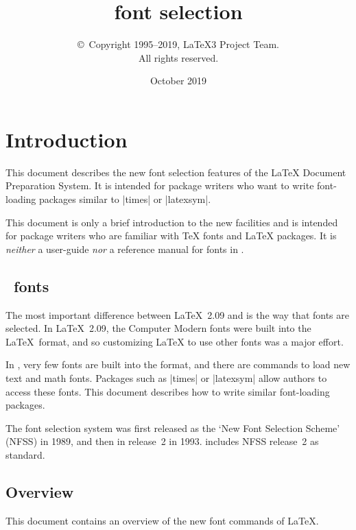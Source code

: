 \documentclass{ltxguide}[1995/11/28]
\title{\LaTeXe{} font selection}
\author{\copyright~Copyright 1995--2019, \LaTeX3 Project Team.\\
   All rights reserved.}
\date{October 2019}
\begin{document}
\maketitle

\tableofcontents

\section{Introduction}

This document describes the new font selection features of the \LaTeX{}
Document Preparation System.  It is intended for package writers who
want to write font-loading packages similar to |times| or |latexsym|.

This document is only a brief introduction to the new facilities and is
intended for package writers who are familiar with \TeX{} fonts and
\LaTeX{} packages.  It is \emph{neither} a user-guide \emph{nor} a
reference manual for fonts in \LaTeXe.

\subsection{\LaTeXe~fonts}

The most important difference between \LaTeX~2.09 and \LaTeXe{} is the
way that fonts are selected.  In \LaTeX~2.09, the Computer Modern fonts
were built into the \LaTeX~format, and so customizing \LaTeX{} to use
other fonts was a major effort.

In \LaTeXe, very few fonts are built into the format, and there are
commands to load new text and math fonts.  Packages such as |times| or
|latexsym| allow authors to access these fonts.  This document describes
how to write similar font-loading packages.

The \LaTeXe{} font selection system was first released as the `New Font
Selection Scheme' (NFSS) in 1989, and then in release~2 in 1993.
\LaTeXe{} includes NFSS release~2 as standard.

\subsection{Overview}

This document contains an overview of the new font commands of \LaTeX.
\end{document}
